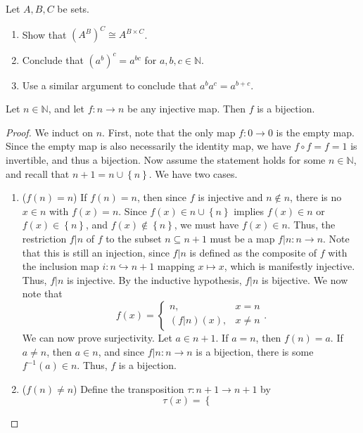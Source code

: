 \documentclass[11pt, letterpaper]{article}
\theoremstyle{definition}
\begin{document}
\begin{problem}[Exercise 3.6.6]\label{prob:5}
	Let $A,B,C$ be sets.
	\begin{enumerate}[label=(\arabic*), align=right]
		\item Show that $(A^B)^C \cong A^{B\times C} $.
		\item Conclude that $(a^b)^c = a^{bc} $ for $a,b,c\in\mathbb{N} $.
		\item Use a similar argument to conclude that $a^ba^c = a^{b+c} $.
	\end{enumerate}
\end{problem}
\begin{lemma}\label{lma:5-2}
	Let $n\in\mathbb{N} $, and let $f : n \to n$ be any injective map. Then $f$ is a bijection.
\end{lemma}
\begin{proof}
	We induct on $n$. First, note that the only map $f : 0 \to 0$ is the empty map. Since the empty map is also necessarily the identity map, we have $f\circ f = f =1$ is invertible, and thus a bijection. Now assume the statement holds for some $n\in\mathbb{N} $, and recall that $n+1 = n \cup \left\{ n \right\} $. We have two cases.
	\begin{enumerate}[label=(\arabic*), align=right]
		\item ($f(n)=n$) If $f(n)=n$, then since $f$ is injective and $n\notin n$, there is no $x\in n$ with $f(x)=n$. Since $f(x)\in n \cup \left\{ n \right\} $ implies $f(x)\in n$ or $f(x)\in \left\{ n \right\} $, and $f(x) \notin \left\{ n \right\} $, we must have $f(x)\in n$. Thus, the restriction $f|n$ of $f$ to the subset $n \subseteq n+1$ must be a map $f|n : n \to n$. Note that this is still an injection, since $f|n$ is defined as the composite of $f$ with the inclusion map $i : n \hookrightarrow n+1$ mapping $x\mapsto x$, which is manifestly injective. Thus, $f|n$ is injective. By the inductive hypothesis, $f|n$ is bijective. We now note that
		\[
			f(x) = \begin{cases}
				n, & x=n \\
				(f|n)(x), & x \neq n
			\end{cases}
		.\]
		We can now prove surjectivity. Let $a\in n+1$. If $a=n$, then $f(n)=a$. If $a \neq n$, then $a\in n$, and since $f|n : n \to n$ is a bijection, there is some $f^{-1} (a)\in n$. Thus, $f$ is a bijection.
		\item ($f(n) \neq n$) Define the transposition $\tau : n+1 \to n+1$ by
		\[
			\tau (x) = \begin{cases}

\end{cases}\]
\end{enumerate}
\end{proof}
\end{document}
